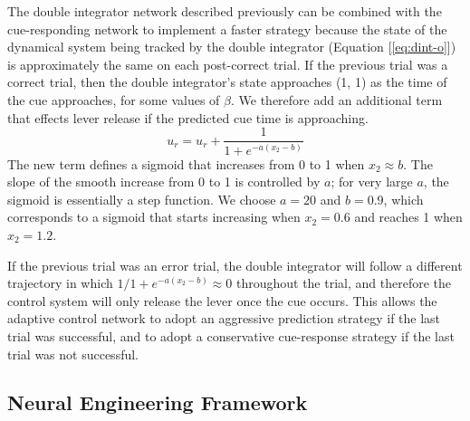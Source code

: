 \documentclass[11pt]{article}
\begin{document}
The double integrator network described
previously can be combined with the
cue-responding network to implement
a faster strategy because
the state of the dynamical system being tracked by
the double integrator (Equation [\ref{eq:dint-o}])
is approximately the same on each post-correct trial.
If the previous trial was a correct trial,
then the double integrator's state
approaches (1, 1) as the time of the cue approaches,
for some values of $\beta$.
We therefore add an additional term
that effects lever release
if the predicted cue time is approaching.
\begin{equation} \label{eq:release}
  u_r = u_r + \frac{1}{1 + e^{-a (x_2 - b)}}
\end{equation}
The new term defines a sigmoid that increases
from 0 to 1 when $x_2 \approx b$.
The slope of the smooth increase
from 0 to 1 is controlled by $a$;
for very large $a$, the sigmoid
is essentially a step function.
We choose $a = 20$ and $b = 0.9$,
which corresponds to a sigmoid
that starts increasing
when $x_2 = 0.6$ and reaches 1 when $x_2 = 1.2$.

If the previous trial was an error trial,
the double integrator
will follow a different trajectory
in which $1 / 1 + e^{-a (x_2 - b)} \approx 0$
throughout the trial,
and therefore the control system
will only release the lever
once the cue occurs.
This allows the adaptive control network
to adopt an aggressive prediction strategy
if the last trial was successful,
and to adopt a conservative cue-response strategy
if the last trial was not successful.


\subsection{Neural Engineering Framework} \label{sec:nef}
\end{document}
